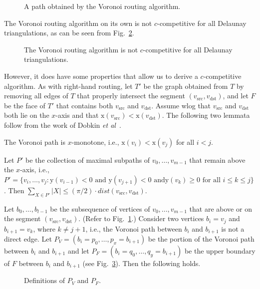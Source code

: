 \documentclass[final]{siamltex}
\newcommand{\centeripe}[1]{\begin{center}\Ipe{#1}\end{center}}
\newcommand{\etal}{{\em et al\/}}
\newcommand{\figlabel}[1]{\label{fig:#1}}
\newcommand{\figref}[1]{\mbox{Fig.~\ref{fig:#1}}}
\newcommand{\lemlabel}[1]{\label{lem:#1}}
\newcommand{\x}{\mathrm{x}}
\newcommand{\y}{\mathrm{y}}
\newcommand{\dist}{\mathit{dist}}
\newcommand{\vsrc}{v_\mathrm{src}}
\newcommand{\vdest}{v_\mathrm{dst}}
\begin{document}
\begin{figure}
\centeripe{voropath}
\caption{A path obtained by the Voronoi routing algorithm.}
\figlabel{voronoi-path}
\end{figure}

The Voronoi routing algorithm on its own is not $c$-competitive for all
Delaunay triangulations, as can be seen from
\figref{voro-bad}.

\begin{figure}
\centeripe{voro-bad}
\caption{The Voronoi routing algorithm is not $c$-competitive 
	for all Delaunay triangulations.}
\figlabel{voro-bad}
\end{figure}

However, it does have some properties that allow us to derive a
$c$-competitive algorithm.  As with right-hand routing, let $T'$ be the
graph obtained from $T$ by removing all edges of $T$ that properly
intersect the segment $(\vsrc,\vdest)$, and let $F$ be the face of
$T'$ that contains both $\vsrc$ and $\vdest$.  Assume wlog that
$\vsrc$ and $\vdest$ both lie on the $x$-axis and that
$\x(\vsrc)<\x(\vdest)$.  The following two lemmata follow from the work of
Dobkin \etal\ \cite{dfs87}.

\begin{lemma}\lemlabel{x-monotone}
The Voronoi path is $x$-monotone, i.e., $\x(v_i)<\x(v_j)$ for all
$i<j$.
\end{lemma}

\begin{lemma}\lemlabel{one-sided}
Let $P'$ be the collection of maximal subpaths of $v_0,\ldots,v_{m-1}$
that remain above the $x$-axis, i.e.,
$P'=\{v_i,\ldots,v_j:\y(v_{i-1})<0\mbox{ and }\y(v_{j+1})<0\mbox{ and
}\y(v_k)\ge 0\mbox{ for all }i\le k\le j\}$.  Then
$\sum_{X\in P'}|X|\le(\pi/2)\cdot\dist(\vsrc,\vdest)$.
\end{lemma}

Let $b_0,\ldots,b_{l-1}$ be the subsequence of vertices of
$v_0,\ldots,v_{m-1}$ that are above or on the segment
$(\vsrc,\vdest)$.  (Refer to \figref{voronoi-path}.)  Consider two
vertices $b_i=v_j$ and $b_{i+1}=v_k$, where $k\neq j+1$, i.e., the
Voronoi path between $b_i$ and $b_{i+1}$ is not a direct edge.  Let
$P_V=(b_i=p_0,\ldots,p_x=b_{i+1})$ be the portion of the Voronoi path
between $b_i$ and $b_{i+1}$ and let $P_F=(b_i=q_0,\ldots,q_y=b_{i+1})$
be the upper boundary of $F$ between $b_i$ and $b_{i+1}$ (see
\figref{voro-lem}).  Then the following holds.

\begin{figure}
\centeripe{voro-lem}
\caption{Definitions of $P_V$ and $P_F$.}
\figlabel{voro-lem}
\end{figure}
\end{document}
